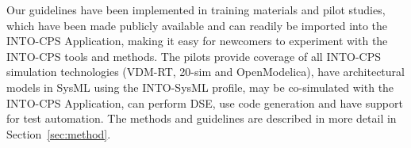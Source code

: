 Our guidelines have been implemented in training materials and pilot studies, which have been made publicly available and can readily be imported into the INTO-CPS Application, making it easy for newcomers to experiment with the INTO-CPS tools and methods. The pilots provide coverage of all INTO-CPS simulation technologies (VDM-RT, 20-sim and OpenModelica), have architectural models in SysML using the INTO-SysML profile, may be co-simulated with the INTO-CPS Application, can perform DSE, use code generation and have support for test automation. The methods and guidelines are described in more detail in Section~\ref{sec:method}.

%
%
%
